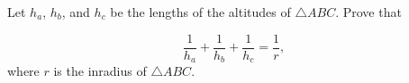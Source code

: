 Let $h_a$, $h_b$, and $h_c$ be the lengths of the altitudes of $\triangle ABC$. Prove that

\[
\dfrac{1}{h_a}+\dfrac{1}{h_b}+\dfrac{1}{h_c}=\dfrac{1}{r},
\]where $r$ is the inradius of $\triangle ABC$.
